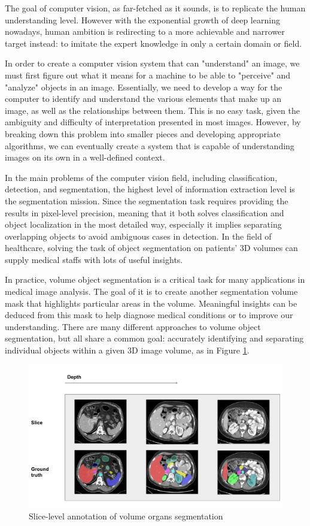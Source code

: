 The goal of computer vision, as far-fetched as it sounds, is to replicate the human understanding level. However with the exponential growth of deep learning nowadays, human ambition is redirecting to a more achievable and narrower target instead: to imitate the expert knowledge in only a certain domain or field.

In order to create a computer vision system that can "understand" an image, we must first figure out what it means for a machine to be able to "perceive" and "analyze" objects in an image. Essentially, we need to develop a way for the computer to identify and understand the various elements that make up an image, as well as the relationships between them. This is no easy task, given the ambiguity and difficulty of interpretation presented in most images. However, by breaking down this problem into smaller pieces and developing appropriate algorithms, we can eventually create a system that is capable of understanding images on its own in a well-defined context.

In the main problems of the computer vision field, including classification, detection, and segmentation, the highest level of information extraction level is the segmentation mission. Since the segmentation task requires providing the results in pixel-level precision, meaning that it both solves classification and object localization in the most detailed way, especially it implies separating overlapping objects to avoid ambiguous cases in detection. In the field of healthcare, solving the task of object segmentation on patients' 3D volumes can supply medical staffs with lots of useful insights.

In practice, volume object segmentation is a critical task for many applications in medical image analysis. The goal of it is to create another segmentation volume mask that highlights particular areas in the volume. Meaningful insights can be deduced from this mask to help diagnose medical conditions or to improve our understanding. There are many different approaches to volume object segmentation, but all share a common goal: accurately identifying and separating individual objects within a given 3D image volume, as in Figure \ref{fig:vos}. 

\begin{figure}[!h]
    \centering
    \includegraphics[width=\textwidth]{content/resources/new_images/intro/pipeline.pdf}
    \caption{Slice-level annotation of volume organs segmentation}
    \label{fig:vos}
\end{figure}

